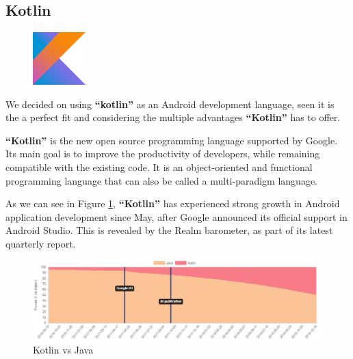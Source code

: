 \documentclass[12pt,a4paper]{report}
\begin{document}
	\subsection{Kotlin}
	\begin{figure}
		\centering
		\includegraphics[width=0.8in]{kotlin-logo.png}	
	\end{figure}
	We decided on using \textbf{``kotlin''} as an Android development language, seen it is the a perfect fit and considering the multiple advantages \textbf{``Kotlin''} has to offer.\par 
	\textbf{``Kotlin''} is the new open source programming language supported by Google. Its main goal is to improve the productivity of developers, while remaining compatible with the existing code. It is an object-oriented and functional programming language that can also be called a multi-paradigm language.\cite{kotlinbook}\par 
	As we can see in Figure \ref{kotlin-label}, \textbf{``Kotlin''} has experienced strong growth in Android application development since May, after Google announced its official support in Android Studio. This is revealed by the Realm barometer, as part of its latest quarterly report.
	\begin{figure}[H]
		\centering
		\includegraphics[width=7in,keepaspectratio]{kotlinjava.jpg}
		\caption{ Kotlin vs Java\protect{}\protect\footnotemark[\thefootnote]}
		
		\label{kotlin-label}
	\end{figure}
\end{document}
